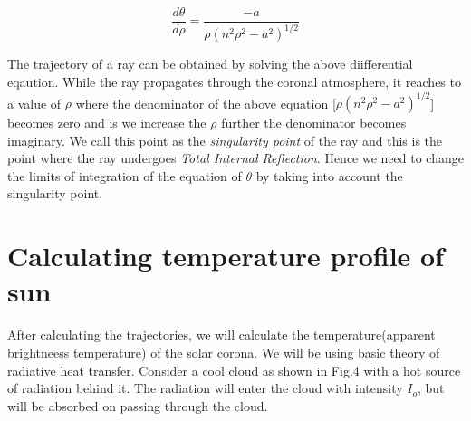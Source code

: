 \documentclass[journal]{IEEEtran}
\begin{document}
$$ \frac{d\theta}{d\rho}  = \frac{-a}{\rho(n^2\rho^2 - a^2)^{1/2}}$$

The trajectory of a ray can be obtained by solving the above diifferential eqaution.
While the ray propagates through the coronal atmosphere, it reaches to a value of $\rho$ where the denominator of the above equation [$\rho(n^2\rho^2 - a^2)^{1/2}$] becomes zero and is we increase the $\rho$ further the denominator becomes imaginary. We call this point as the \emph{singularity point} of the ray and this is the point where the ray undergoes \emph{Total Internal Reflection}. Hence  we need to change the limits of integration of the equation of $\theta$ by taking into account the singularity point.   

  
  




\section{Calculating temperature profile of sun}
After calculating the trajectories, we will calculate the temperature(apparent brightneess temperature) of the solar corona. We will be using basic theory of radiative heat transfer. 
Consider a cool cloud as shown in Fig.4 with a hot source of radiation behind it. The radiation will enter
the cloud with intensity $I_o$, but will be absorbed on passing through the cloud.
\end{document}
